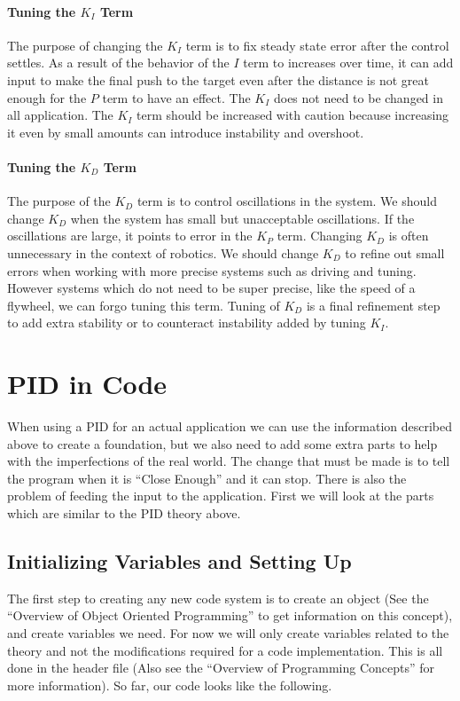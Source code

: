 \documentclass[12pt]{article}
\begin{document}
\paragraph{Tuning the $K_I$ Term}
    The purpose of changing the $K_I$ term is to fix steady state error after the control settles. As a result of the behavior of the $I$ term to increases over time, it can add input to make the final push to the target even after the distance is not great enough for the $P$ term to have an effect. The $K_I$ does not need to be changed in all application. The $K_I$ term should be increased with caution because increasing it even by small amounts can introduce instability and overshoot.

\paragraph{Tuning the $K_D$ Term}
    The purpose of the $K_D$ term is to control oscillations in the system. We should change $K_D$ when the system has small but unacceptable oscillations. If the oscillations are large, it points to error in the $K_P$ term. Changing $K_D$ is often unnecessary in the context of robotics. We should change $K_D$ to refine out small errors when working with more precise systems such as driving and tuning. However systems which do not need to be super precise, like the speed of a flywheel, we can forgo tuning this term. Tuning of $K_D$ is a final refinement step to add extra stability or to counteract instability added by tuning $K_I$.

\newpage
\section{PID in Code}
    When using a PID for an actual application we can use the information described above to create a foundation, but we also need to add some extra parts to help with the imperfections of the real world. The change that must be made is to tell the program when it is ``Close Enough'' and it can stop. There is also the problem of feeding the input to the application. First we will look at the parts which are similar to the PID theory above.

\subsection{Initializing Variables and Setting Up}
    The first step to creating any new code system is to create an object (See the ``Overview of Object Oriented Programming'' to get information on this concept), and create variables we need. For now we will only create variables related to the theory and not the modifications required for a code implementation. This is all done in the header file (Also see the ``Overview of Programming Concepts'' for more information). So far, our code looks like the following.
\end{document}
